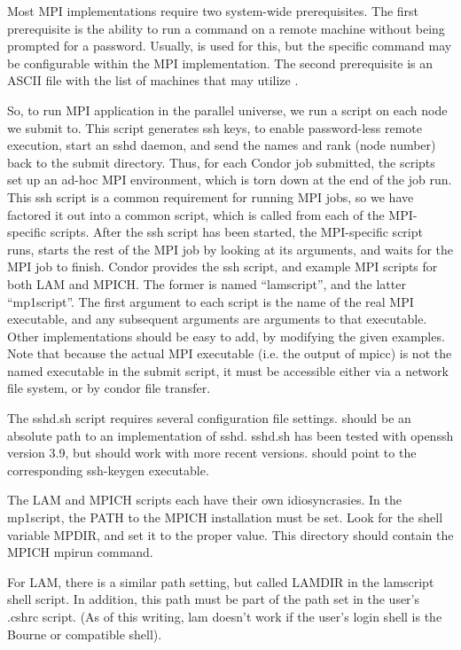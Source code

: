 Most MPI implementations require two system-wide prerequisites.
The first prerequisite is the ability to run a command
on a remote machine without being prompted for a password.
Usually,  is used for this, but the
specific command may be configurable within the MPI implementation.
The second prerequisite is an ASCII file with the
list of machines that may utilize .

So, to run MPI application in the parallel universe, we run a script
on each node we submit to.  This script generates ssh keys, to enable
password-less remote execution, start an sshd daemon, and send the
names and rank (node number) back to the submit directory.  Thus, for
each Condor job submitted, the scripts set up an ad-hoc MPI
environment, which is torn down at the end of the job run.  This ssh
script is a common requirement for running MPI jobs, so we have
factored it out into a common script, which is called from each of the
MPI-specific scripts.  After the ssh script has been started, the
MPI-specific script runs, starts the rest of the MPI job by looking at
its arguments, and waits for the MPI job to finish.  Condor provides
the ssh script, and example MPI scripts for both LAM and MPICH.  The
former is named ``lamscript'', and the latter ``mp1script''.  The
first argument to each script is the name of the real MPI executable,
and any subsequent arguments are arguments to that executable.  Other
implementations should be easy to add, by modifying the given
examples.  Note that because the actual MPI executable (i.e. the
output of mpicc) is not the named executable in the submit script, it
must be accessible either via a network file system, or by condor file
transfer.

The sshd.sh script requires several configuration file settings.
 should be an absolute path to an implementation of
sshd.  sshd.sh has been tested with openssh version 3.9, but should
work with more recent versions.   should
point to the corresponding ssh-keygen executable.

The LAM and MPICH scripts each have their own idiosyncrasies.  In the
mp1script, the PATH to the MPICH installation must be set.  Look
for the shell variable MPDIR, and set it to the proper value.  This
directory should contain the MPICH mpirun command.

For LAM, there is a similar path setting, but called LAMDIR in the
lamscript shell script.  In addition, this path must be part of the
path set in the user's .cshrc script.  (As of this writing, lam doesn't
work if the user's login shell is the Bourne or compatible shell).

